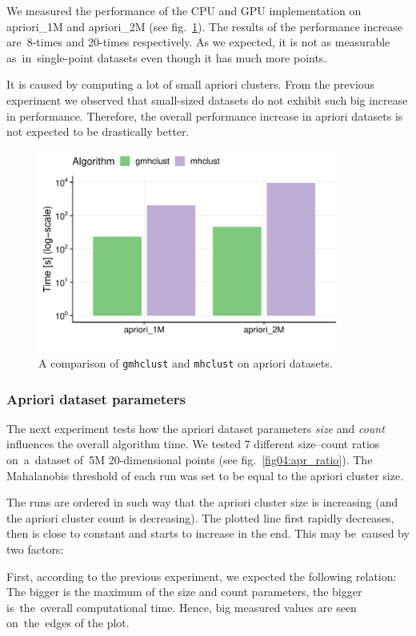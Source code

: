 We measured the performance of the CPU and GPU implementation on apriori\_1M and apriori\_2M (see fig.~\ref{fig04:apr_perf_comp}). The results of the performance increase are~8-times and 20-times respectively. As we expected, it is not as measurable as~in~single-point datasets even though it has much more points. 

It is caused by computing a lot of small apriori clusters. From the previous experiment we observed that small-sized datasets do not exhibit such big increase in performance. Therefore, the overall performance increase in apriori datasets is not expected to be drastically better.

\begin{figure}\centering
	\includegraphics[width=10cm]{img/apriori_perf_comp}
	\caption{A comparison of \texttt{gmhclust} and \texttt{mhclust} on apriori datasets.}
	\label{fig04:apr_perf_comp}
\end{figure}

\subsubsection{Apriori dataset parameters}

The next experiment tests how the apriori dataset parameters \emph{size} and \emph{count} influences the overall algorithm time. We tested 7 different size--count ratios on~a~dataset of~5M 20-dimensional points (see fig.~\ref{fig04:apr_ratio}). The Mahalanobis threshold of each run was set to be equal to the apriori cluster size.

The runs are ordered in such way that the apriori cluster size is increasing (and the apriori cluster count is decreasing). The plotted line first rapidly decreases, then is close to constant and starts to increase in the end. This may be~caused by two factors:

First, according to the previous experiment, we expected the following relation: The bigger is the maximum of the size and count parameters, the bigger is~the~overall computational time. Hence, big measured values are seen on~the~edges of the plot. 


